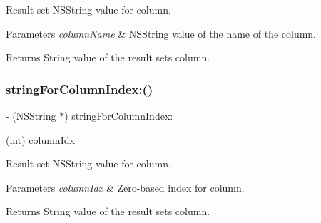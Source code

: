 Result set {\ttfamily N\+S\+String} value for column.


\begin{DoxyParams}{Parameters}
{\em column\+Name} & {\ttfamily N\+S\+String} value of the name of the column.\\
\hline
\end{DoxyParams}
\begin{DoxyReturn}{Returns}
String value of the result set\textquotesingle{}s column. 
\end{DoxyReturn}
\mbox{\label{interface_o_p_t_l_y_f_m_d_b_result_set_a781fca5064058907dc16d9723ee2a4b6}} 
\subsubsection{\texorpdfstring{string\+For\+Column\+Index\+:()}{stringForColumnIndex:()}}
{\footnotesize\ttfamily -\/ (N\+S\+String $\ast$) string\+For\+Column\+Index\+: \begin{DoxyParamCaption}\item[{(int)}]{column\+Idx }\end{DoxyParamCaption}}

Result set {\ttfamily N\+S\+String} value for column.


\begin{DoxyParams}{Parameters}
{\em column\+Idx} & Zero-\/based index for column.\\
\hline
\end{DoxyParams}
\begin{DoxyReturn}{Returns}
String value of the result set\textquotesingle{}s column. 
\end{DoxyReturn}
\mbox{\label{interface_o_p_t_l_y_f_m_d_b_result_set_a690f0dcd5f0e4314128f04b1441a5713}} 
